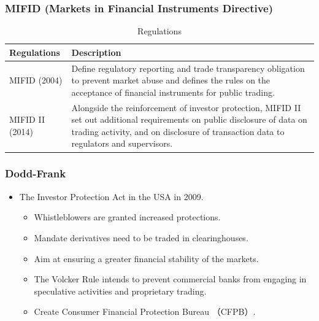 \subsubsection{MIFID (Markets in Financial Instruments Directive) }

\begin{table}[H]
    \centering
    \caption{Regulations}
    \renewcommand{\arraystretch}{1.5} %
    \begin{tabular}{|p{4cm}|p{10cm}|}
        \hline
        \textbf{Regulations} & \textbf{Description} \\ \hline
        MIFID (2004) & Define regulatory reporting and trade transparency obligation to prevent market abuse and defines the rules on the acceptance of financial instruments for public trading. \\ \hline
        MIFID II (2014) & Alongside the reinforcement of investor protection, MIFID II set out additional requirements on public disclosure of data on trading activity, and on disclosure of transaction data to regulators and supervisors. \\ \hline
    \end{tabular}
\end{table}




\subsubsection{Dodd-Frank}
\begin{itemize}
\item The Investor Protection Act in the USA in 2009.
    \begin{itemize}
    \item Whistleblowers are granted increased protections.
    \item Mandate derivatives need to be traded in clearinghouses.
    \item Aim at ensuring a greater financial stability of the markets.
    \item The Volcker Rule intends to prevent commercial banks from engaging in speculative activities and proprietary trading.
    \item Create Consumer Financial Protection Bureau （CFPB）.
    \end{itemize}


\end{itemize}




